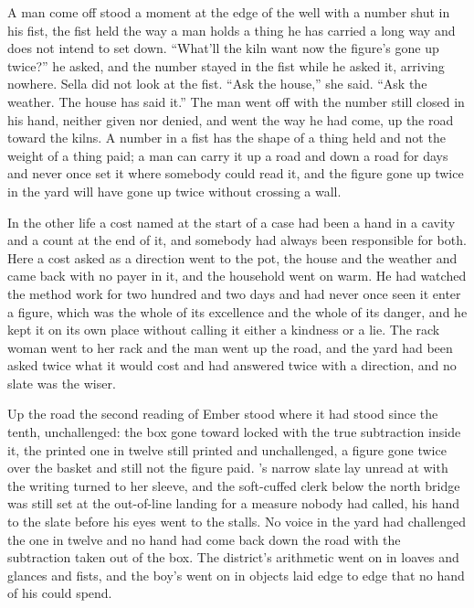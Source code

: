 A man come off  stood a moment at the edge of the well with a number shut in his fist, the fist held the way a man holds a thing he has carried a long way and does not intend to set down. “What'll the kiln want now the figure's gone up twice?” he asked, and the number stayed in the fist while he asked it, arriving nowhere. Sella did not look at the fist. “Ask the house,” she said. “Ask the weather. The house has said it.” The man went off with the number still closed in his hand, neither given nor denied, and went the way he had come, up the road toward the kilns. A number in a fist has the shape of a thing held and not the weight of a thing paid; a man can carry it up a road and down a road for days and never once set it where somebody could read it, and the figure gone up twice in the yard will have gone up twice without crossing a wall.

In the other life a cost named at the start of a case had been a hand in a cavity and a count at the end of it, and somebody had always been responsible for both. Here a cost asked as a direction went to the pot, the house and the weather and came back with no payer in it, and the household went on warm. He had watched the method work for two hundred and two days and had never once seen it enter a figure, which was the whole of its excellence and the whole of its danger, and he kept it on its own place without calling it either a kindness or a lie. The rack woman went to her rack and the man went up the road, and the yard had been asked twice what it would cost and had answered twice with a direction, and no slate was the wiser.

Up the road the second reading of Ember stood where it had stood since the tenth, unchallenged: the box gone toward  locked with the true subtraction inside it, the printed one in twelve still printed and unchallenged, a figure gone twice over the basket and still not the figure paid. 's narrow slate lay unread at  with the writing turned to her sleeve, and the soft-cuffed clerk below the north bridge was still set at the out-of-line landing for a measure nobody had called, his hand to the slate before his eyes went to the stalls. No voice in the yard had challenged the one in twelve and no hand had come back down the road with the subtraction taken out of the box. The district's arithmetic went on in loaves and glances and fists, and the boy's went on in objects laid edge to edge that no hand of his could spend.

